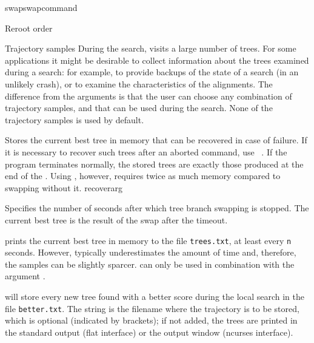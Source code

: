 \begin{command}{swap}{swapcommand}
\begin{arguments}
\begin{argumentgroup}{Reroot order}
        \end{argumentgroup}

	    \begin{argumentgroup}{Trajectory samples}
	        {During the search, \poy visits a large number of trees. For some
            applications it might be desirable to  collect information about the
            trees examined during a search: for example, to provide backups of
            the state of a search (in an unlikely crash), or to examine the
            characteristics of the alignments.  The difference from the
             arguments is that the user can choose any
            combination of trajectory samples, and that can be used during the
            search. None of the trajectory samples is used by default.}

	            {Stores the current best tree in memory that can be recovered in
                case of failure. If it is necessary to recover such trees after
                an aborted command, use ~.  If the program
                terminates normally, the stored trees are exactly those produced
                at the end of the . Using
                , however, requires twice as much memory
                compared to swapping without it.}
                {recoverarg}

                {Specifies the number of seconds after which tree branch
                swapping is stopped. The current best tree is the result of the
                swap after the timeout.} 
                {}

	            {  prints the current
                best tree in memory to the file \texttt{trees.txt}, at least every 
                \texttt{n} seconds. However, \poy typically underestimates the amount of
                time and, therefore, the samples can be slightly sparcer.  
                can only be used in combination with the argument .}
                {}

			    { will store every new tree
                found with a better score during the local search in the file
                \texttt{better.txt}. The string is the filename where the
                trajectory is to be stored, which is optional (indicated by
                brackets); if not added, the trees are printed in the standard
                output (flat interface) or the output window (ncurses
                interface).}
                {} 


\end{argumentgroup}
\end{arguments}
\end{command}
